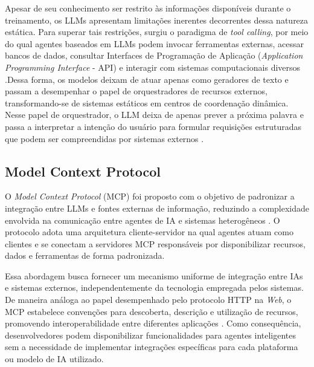 Apesar de seu conhecimento ser restrito às informações disponíveis durante o treinamento, os LLMs apresentam limitações inerentes decorrentes dessa natureza estática. Para superar tais restrições, surgiu o paradigma de \textit{tool calling}, por meio do qual agentes baseados em LLMs podem invocar ferramentas externas, acessar bancos de dados, consultar Interfaces de Programação de Aplicação 
(\textit{Application Programming Interface} - API) e interagir com sistemas computacionais diversos \cite{mcpAtFirstGlance}.Dessa forma, os modelos deixam de atuar apenas como geradores de texto e passam a desempenhar o papel de orquestradores de recursos externos, transformando-se de sistemas estáticos em centros de coordenação dinâmica. Nesse papel de orquestrador, o LLM deixa de apenas prever a próxima palavra e passa a interpretar a intenção do usuário para formular requisições estruturadas que podem ser compreendidas por sistemas externos \cite{2025arXiv250814704L}.

\subsection{Model Context Protocol}

O \textit{Model Context Protocol} (MCP) foi proposto com o objetivo de padronizar a integração entre LLMs e fontes externas de informação, reduzindo a complexidade envolvida na comunicação entre agentes de IA e sistemas heterogêneos \cite{shi2026description}. O protocolo adota uma arquitetura cliente-servidor na qual agentes atuam como clientes e se conectam a servidores MCP responsáveis por disponibilizar recursos, dados e ferramentas de forma padronizada.

Essa abordagem busca fornecer um mecanismo uniforme de integração entre IAs e sistemas externos, independentemente da tecnologia empregada pelos sistemas. De maneira análoga ao papel desempenhado pelo protocolo HTTP na \textit{Web}, o MCP estabelece convenções para descoberta, descrição e utilização de recursos, promovendo interoperabilidade entre diferentes aplicações \cite{guo2025measurement}. Como consequência, desenvolvedores podem disponibilizar funcionalidades para agentes inteligentes sem a necessidade de implementar integrações específicas para cada plataforma ou modelo de IA utilizado.

